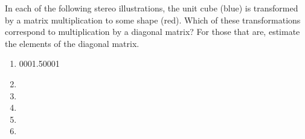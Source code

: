 \begin{exercise} \label{ex:} 
In each of the following stereo illustrations, the unit cube (blue) is transformed by a matrix multiplication to some shape (red).
Which of these transformations correspond to multiplication by a diagonal matrix?  
For those that are, estimate the elements of the diagonal matrix.
\begin{enumerate}
\def\unithousesize{small}

\item {}000{1.5}000{1}

\item {}

\item {}

\item {}

\item {}

\item {}

\end{enumerate}
\end{exercise}



